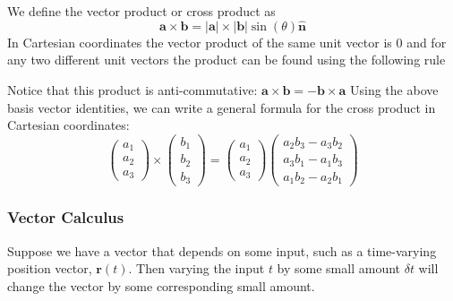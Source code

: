 \documentclass[11pt,titlepage]{article}
\numberwithin{equation}{subsection}
\begin{document}
We define the vector product or cross product as
\begin{equation}
    \mathbf{a}\times\mathbf{b}=|\mathbf{a}|\times|\mathbf{b}|\sin(\theta)\mathbf{\hat{n}}
\end{equation}
In Cartesian coordinates the vector product of the same unit vector is 0 and for any two different unit vectors the product can be found using the following rule
\begin{tcolorbox}
\centering
{}
\end{tcolorbox}
Notice that this product is anti-commutative: $\mathbf{a} \times \mathbf{b} = -\mathbf{b} \times \mathbf{a}$
Using the above basis vector identities, we can write a general formula for the cross product in
Cartesian coordinates:
\begin{equation}
\left(
    \begin{array}{c}
         a_1 \\
         a_2 \\
         a_3
    \end{array}
    \right)
\times
\left(
    \begin{array}{c}
         b_1 \\
         b_2 \\
         b_3
    \end{array}
    \right)
    =
    \left(
    \begin{array}{c}
         a_1 \\
         a_2 \\
         a_3
    \end{array}
    \right)
    \left(
    \begin{array}{c}
         a_2b_3-a_3b_2 \\
         a_3b_1-a_1b_3 \\
         a_1b_2-a_2b_1
    \end{array}
    \right)
\end{equation}
\subsubsection{Vector Calculus}
Suppose we have a vector that depends on some input, such as a time-varying position vector, $\mathbf{r}(t)$. Then varying the input $t$ by some small amount $\delta t$ will change the vector by some corresponding small amount.
\end{document}
